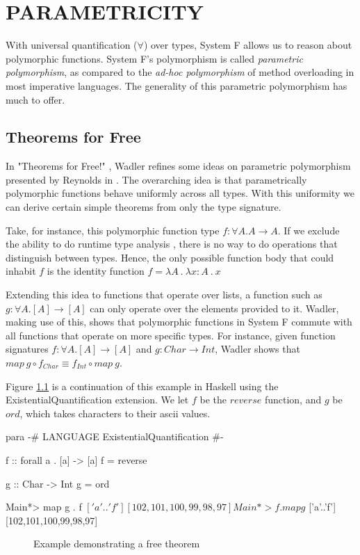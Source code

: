 \chapter{PARAMETRICITY}\label{ch:parametricity}
With universal quantification ($\forall $) over types, System F allows us to reason about polymorphic functions. System F's polymorphism is called \emph{parametric polymorphism}, as compared to the \emph{ad-hoc polymorphism} of method overloading in most imperative languages. The generality of this parametric polymorphism has much to offer.

\section{Theorems for Free}
In "Theorems for Free!" \cite{theoremsForFree}, Wadler refines some ideas on parametric polymorphism presented by Reynolds in \cite{reynolds}. The overarching idea is that parametrically polymorphic functions behave uniformly across all types. With this uniformity we can derive certain simple theorems from only the type signature.

Take, for instance, this polymorphic function type $f : \forall A . A \rightarrow A$. If we exclude the ability to do runtime type analysis \cite{vytinFree}, there is no way to do operations that distinguish between types. Hence, the only possible function body that could inhabit $f$ is the identity function $f = \lambda A\ .\ \lambda x : A\ .\ x $

Extending this idea to functions that operate over lists, a function such as $g : \forall A . [A] \rightarrow [A] $ can only operate over the elements provided to it. Wadler, making use of this, shows that polymorphic functions in System F commute with all functions that operate on more specific types. For instance, given function signatures $f : \forall A . [A] \rightarrow [A]$ and $g : Char \rightarrow Int$, Wadler shows that $map\ g \circ f_{Char} \equiv f_{Int} \circ map\ g$.

Figure \ref{fig:para} is a continuation of this example in Haskell using the ExistentialQuantification extension. We let $f$ be the $reverse$ function, and $g$ be $ord$, which takes characters to their ascii values.
\begin{SaveVerbatim}{para}
{-# LANGUAGE ExistentialQuantification #-}

f :: forall a . [a] -> [a]
f = reverse

g :: Char -> Int
g = ord

Main*> map g . f $ ['a'..'f']
  [102,101,100,99,98,97]

Main*> f . map g $ ['a'..'f']
  [102,101,100,99,98,97]
\end{SaveVerbatim}
\begin{figure}
  \caption{Example demonstrating a free theorem}
  \label{fig:para}
\end{figure}

